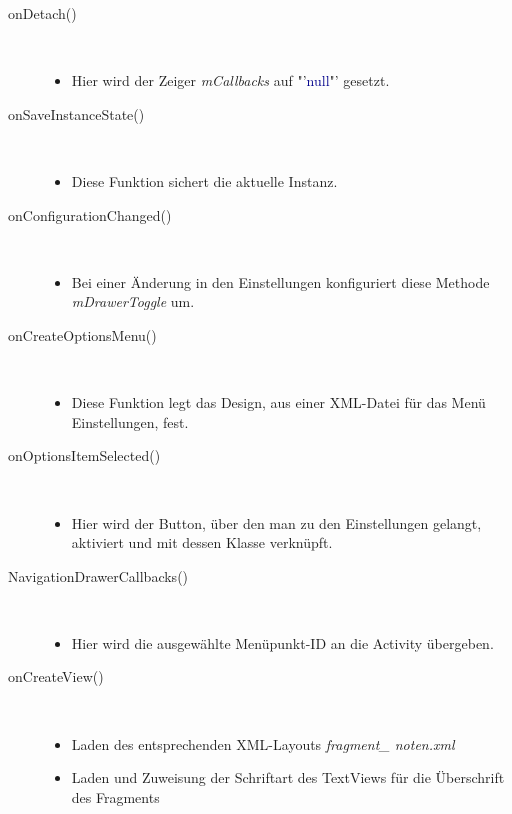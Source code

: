 \begin{description}
\item[onDetach()]~\par
\begin{itemize}
\item Hier wird der Zeiger \textit{mCallbacks} auf "'\textcolor{darkblue}{null}"' gesetzt.
\end{itemize}
\item[onSaveInstanceState()]~\par
\begin{itemize}
\item Diese Funktion sichert die aktuelle Instanz.
\end{itemize}
\item[onConfigurationChanged()]~\par
\begin{itemize}
\item Bei einer Änderung in den Einstellungen konfiguriert diese Methode \textit{mDrawerToggle} um.
\end{itemize} 
\item[onCreateOptionsMenu()]~\par
\begin{itemize}
\item Diese Funktion legt das Design, aus einer XML-Datei für das Menü Einstellungen, fest.
\end{itemize} 
\item[onOptionsItemSelected()]~\par
\begin{itemize}
\item Hier wird der Button, über den man zu den Einstellungen gelangt, aktiviert und mit dessen Klasse verknüpft.
\end{itemize}
\item[NavigationDrawerCallbacks()]~\par
\begin{itemize}
\item Hier wird die ausgewählte Menüpunkt-ID an die Activity übergeben.
\end{itemize}
\newpage
{}
\item[onCreateView()]~\par
\begin{itemize}
\item Laden des entsprechenden XML-Layouts \textit{fragment\_ noten.xml}
\item Laden und Zuweisung der Schriftart des TextViews für die Überschrift des Fragments
\end{itemize}


\end{description}
